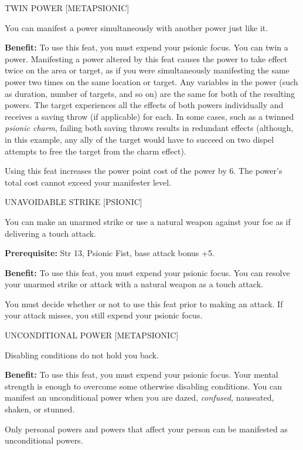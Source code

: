 \documentclass{article}
\begin{document}
\vspace{12pt}
TWIN POWER [METAPSIONIC]

You can manifest a power simultaneously with another power just like it.

\textbf{Benefit:} To use this feat, you must expend your psionic focus. You can 
twin a power. Manifesting a power altered by this feat causes the power to take 
effect twice on the area or target, as if you were simultaneously manifesting the 
same power two times on the same location or target. Any variables in the power 
(such as duration, number of targets, and so on) are the same for both of the resulting 
powers. The target experiences all the effects of both powers individually and 
receives a saving throw (if applicable) for each. In some cases, such as a twinned 
\textit{psionic charm}, failing both saving throws results in redundant effects 
(although, in this example, any ally of the target would have to succeed on two 
dispel attempts to free the target from the charm effect).

Using this feat increases the power point cost of the power by 6. The power's total 
cost cannot exceed your manifester level.

\vspace{12pt}
UNAVOIDABLE STRIKE [PSIONIC]

You can make an unarmed strike or use a natural weapon against your foe as if delivering 
a touch attack.

\textbf{Prerequisite:} Str 13, Psionic Fist, base attack bonus +5.

\textbf{Benefit:} To use this feat, you must expend your psionic focus. You can 
resolve your unarmed strike or attack with a natural weapon as a touch attack.

You must decide whether or not to use this feat prior to making an attack. If your 
attack misses, you still expend your psionic focus.

\vspace{12pt}
UNCONDITIONAL POWER [METAPSIONIC]

Disabling conditions do not hold you back.

\textbf{Benefit:} To use this feat, you must expend your psionic focus. Your mental 
strength is enough to overcome some otherwise disabling conditions. You can manifest 
an unconditional power when you are dazed, \textit{confused, }nauseated, shaken, 
or stunned.

Only personal powers and powers that affect your person can be manifested as unconditional 
powers.
\end{document}

